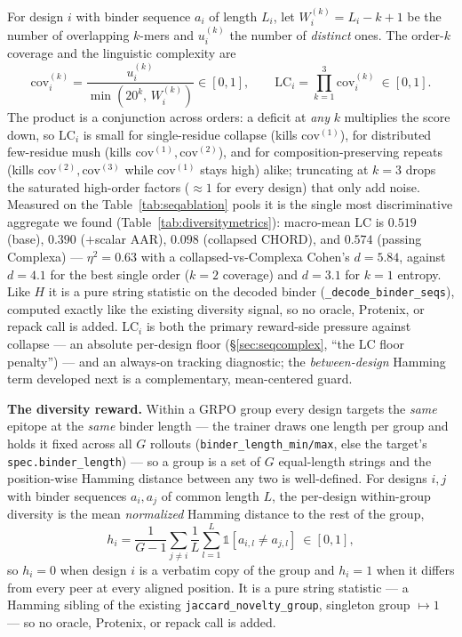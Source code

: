 \documentclass[11pt]{article}
\newcommand{\ttk}[1]{\texttt{\small #1}}
\begin{document}
For design $i$ with binder sequence $a_i$ of length $L_i$, let $W^{(k)}_i=L_i-k+1$ be the number of
overlapping $k$-mers and $u^{(k)}_i$ the number of \emph{distinct} ones. The order-$k$ coverage and the
linguistic complexity are
\[
\mathrm{cov}^{(k)}_i=\frac{u^{(k)}_i}{\min(20^k,\,W^{(k)}_i)}\in[0,1],
\qquad
\mathrm{LC}_i=\prod_{k=1}^{3}\mathrm{cov}^{(k)}_i\ \in[0,1].
\]
The product is a conjunction across orders: a deficit at \emph{any} $k$ multiplies the score down, so
$\mathrm{LC}_i$ is small for single-residue collapse (kills $\mathrm{cov}^{(1)}$), for distributed
few-residue mush (kills $\mathrm{cov}^{(1)},\mathrm{cov}^{(2)}$), and for composition-preserving repeats
(kills $\mathrm{cov}^{(2)},\mathrm{cov}^{(3)}$ while $\mathrm{cov}^{(1)}$ stays high) alike; truncating at
$k{=}3$ drops the saturated high-order factors ($\approx1$ for every design) that only add noise.
Measured on the Table~\ref{tab:seqablation} pools it is the single most discriminative aggregate we
found (Table~\ref{tab:diversitymetrics}): macro-mean $\mathrm{LC}$ is $0.519$ (base), $0.390$ ($+$scalar
AAR), $0.098$ (collapsed CHORD), and $0.574$ (passing Complexa) --- $\eta^2{=}0.63$ with a
collapsed-vs-Complexa Cohen's $d{=}5.84$,
against $d{=}4.1$ for the best single order ($k{=}2$ coverage) and $d{=}3.1$ for $k{=}1$ entropy. Like
$H$ it is a pure string statistic on the decoded binder (\ttk{\_decode\_binder\_seqs}), computed exactly
like the existing diversity signal, so no oracle, Protenix, or repack call is added. $\mathrm{LC}_i$ is
both the primary reward-side pressure against collapse --- an absolute per-design floor
(\S\ref{sec:seqcomplex}, ``the $\mathrm{LC}$ floor penalty'') --- and an always-on tracking diagnostic;
the \emph{between-design} Hamming term developed next is a complementary, mean-centered guard.

\textbf{The diversity reward.} Within a GRPO group every design targets the \emph{same} epitope at the
\emph{same} binder length --- the trainer draws one length per group and holds it fixed across all $G$
rollouts (\ttk{binder\_length\_min/max}, else the target's \ttk{spec.binder\_length}) --- so a group is a
set of $G$ equal-length strings and the position-wise Hamming distance between any two is well-defined.
For designs $i,j$ with binder sequences $a_i,a_j$ of common length $L$, the per-design within-group
diversity is the mean \emph{normalized} Hamming distance to the rest of the group,
\[
h_i=\frac1{G-1}\sum_{j\ne i}\frac1{L}\sum_{l=1}^{L}\mathbb 1\!\left[a_{i,l}\ne a_{j,l}\right]\ \in[0,1],
\]
so $h_i{=}0$ when design $i$ is a verbatim copy of the group and $h_i{=}1$ when it differs from every peer
at every aligned position. It is a pure string statistic --- a Hamming sibling of the existing
\ttk{jaccard\_novelty\_group}, singleton group $\mapsto 1$ --- so no oracle, Protenix, or repack call is
added.
\end{document}
